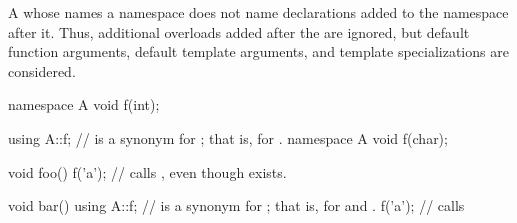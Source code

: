 \pnum
\begin{note}
A 
whose  names a namespace
does not name declarations added to the namespace after it. Thus, additional
overloads added after the  are ignored, but
default function arguments, default template
arguments, and
template specializations are considered.
\end{note}
\begin{example}
\begin{codeblock}
namespace A {
  void f(int);
}

using A::f;         //  is a synonym for ; that is, for .
namespace A {
  void f(char);
}

void foo() {
  f('a');           // calls , even though  exists.
}

void bar() {
  using A::f;       //  is a synonym for ; that is, for  and .
  f('a');           // calls 
}
\end{codeblock}
\end{example}


